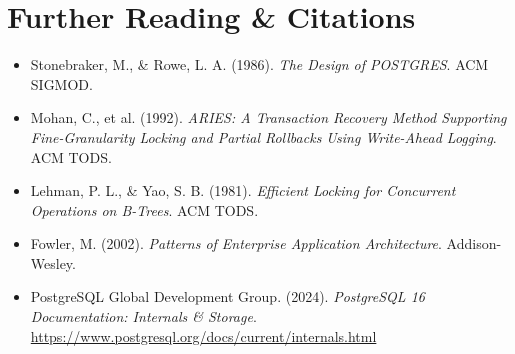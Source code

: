 \section{Further Reading \& Citations}

\begin{itemize}[leftmargin=15pt]
  \item Stonebraker, M., \& Rowe, L. A. (1986). \textit{The Design of POSTGRES}. ACM SIGMOD.
  \item Mohan, C., et al. (1992). \textit{ARIES: A Transaction Recovery Method Supporting Fine-Granularity Locking and Partial Rollbacks Using Write-Ahead Logging}. ACM TODS.
  \item Lehman, P. L., \& Yao, S. B. (1981). \textit{Efficient Locking for Concurrent Operations on B-Trees}. ACM TODS.
  \item Fowler, M. (2002). \textit{Patterns of Enterprise Application Architecture}. Addison-Wesley.
  \item PostgreSQL Global Development Group. (2024). \textit{PostgreSQL 16 Documentation: Internals \& Storage}. \url{https://www.postgresql.org/docs/current/internals.html}
\end{itemize}
